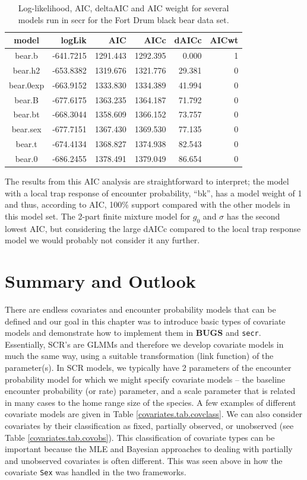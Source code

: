 \begin{table}[ht]
\centering
\caption{Log-likelihood, AIC, deltaAIC and AIC weight for several models run in secr for the Fort Drum black bear data set.}
\begin{tabular}{crrrrr}
\hline \hline
model     &  logLik   &   AIC    &   AICc   & dAICc  & AICwt \\ \hline
bear.b    & -641.7215 & 1291.443 & 1292.395 & 0.000  &  1 \\
bear.h2   & -653.8382 & 1319.676 & 1321.776 & 29.381 &  0 \\
bear.0exp & -663.9152 & 1333.830 & 1334.389 & 41.994 &  0 \\
bear.B    & -677.6175 & 1363.235 & 1364.187 & 71.792 &  0 \\
bear.bt   & -668.3044 & 1358.609 & 1366.152 & 73.757 &  0 \\
bear.sex  & -677.7151 & 1367.430 & 1369.530 & 77.135 &  0 \\
bear.t    & -674.4134 & 1368.827 & 1374.938 & 82.543 &  0 \\
bear.0    & -686.2455 & 1378.491 & 1379.049 & 86.654 &  0 \\ \hline
\end{tabular}
\label{covariates.tab.secrAIC}
\end{table}


The results from this AIC analysis are straightforward to interpret;
the model with a local trap response of encounter probability, ``bk'',
has a model weight of 1 and thus, according to AIC, 100\% support
compared with the other models in this model set.  The 2-part finite
mixture model for $g_0$ and $\sigma$ has the second lowest AIC, but
considering the large dAICc compared to the local trap response model
we would probably not consider it any further.


\section{Summary and Outlook}

There are endless covariates and encounter probability models that can
be defined and our goal in this chapter was to introduce basic types
of covariate models and demonstrate how to implement them in {\bf
  BUGS} and \mbox{\tt secr}.  Essentially, SCR's are GLMMs and
therefore we develop covariate models in much the same way, using a
suitable transformation (link function) of the parameter(s). In SCR
models, we typically have 2 parameters of the encounter probability
model for which we might specify covariate models -- the baseline
encounter probability (or rate) parameter, and a scale parameter that
is related in many cases to the home range size of the species.  A few
examples of different covariate models are given in Table
\ref{covariates.tab.covclass}.  We can also consider covariates by
their classification as fixed, partially observed, or unobserved (see
Table \ref{covariates.tab.covobs}). This classification of covariate
types can be important because the MLE and Bayesian approaches to
dealing with partially and unobserved covariates is often different.
This was seen above in how the covariate \mbox{\tt Sex} was handled in
the two frameworks.

